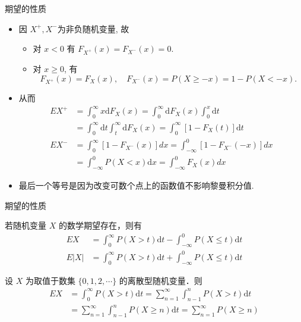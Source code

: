 \documentclass[Prob-All.tex]{subfiles}
\begin{document}
\begin{frame}{期望的性质}
\zheng
\begin{itemize}[<+-|alert@+>]
\item 因 $X^{+}, X^{-}$为非负随机变量, 故
\begin{itemize}[<+-|alert@+>]
\item  对 $x<0$ 有 $F_{X^{+}}(x)=F_{X^{-}}(x)=0$.
\item 对 $x \geqslant 0$, 有
$$F_{X^{+}}(x)=F_{X}(x), \quad F_{X^{-}}(x)=P(X\geq -x)=1-P(X<-x).$$
\end{itemize}

\item 从而 %
{\small \begin{align*}
E X^{+} & =\int_{0}^{\infty} x \mathrm{d} F_{X}(x)=\int_{0}^{\infty} \mathrm{d} F_{X}(x) \int_{0}^{x} \mathrm{d} t \\
 &=\int_{0}^{\infty} \mathrm{d} t \int_{t}^{\infty} \mathrm{d} F_{X}(x)=\int_{0}^{\infty}\left[1-F_{X}(t)\right] \mathrm{d} t\\
 E X^{-}  & =\int_{0}^{\infty} [1-F_{X^-}(x)]dx=\int_{-\infty}^{0} [1-F_{X^{-}}(-x)] dx\\
 &=\int_{-\infty}^{0} P(X<x)\mathrm{d} x=\int_{-\infty}^{0} F_X(x)dx
\end{align*}}
\item 最后一个等号是因为改变可数个点上的函数值不影响黎曼积分值.

\end{itemize}
\end{frame}

\begin{frame}{期望的性质}


\begin{thm}\label{theorem:4.2.5}
若随机变量 $X$ 的数学期望存在，则有
\begin{align*}
E X&=\int_{0}^{\infty} P(X>t) \mathrm{d} t-\int_{-\infty}^{0} P(X \leqslant t) \mathrm{d} t\\
E|X|&=\int_{0}^{\infty} P(X>t) \mathrm{d} t+\int_{-\infty}^{0} P(X \leqslant t) \mathrm{d} t
\end{align*}
\end{thm}

\pause

\begin{exam}
 设 $X$ 为取值于数集 $\{0,1,2, \cdots\}$ 的离散型随机变量．则
\begin{align*}
E X  &=\int_{0}^{\infty} P(X>t) \mathrm{d} t=\sum_{n=1}^{\infty} \int_{n-1}^{n} P(X>t) \mathrm{d} t\\
&=\sum_{n=1}^{\infty} \int_{n-1}^{n} P(X \geqslant n) \mathrm{d} t=\sum_{n=1}^{\infty} P(X \geqslant n)
\end{align*}

\end{exam}

\end{frame}
\end{document}
